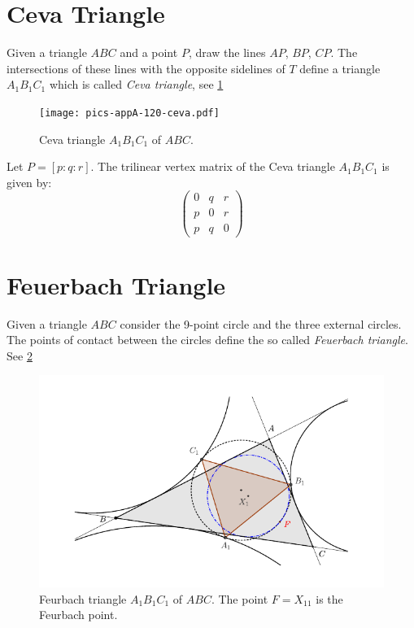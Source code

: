    \section{Ceva Triangle}
   
   Given a triangle $ABC$ and a point $P$, draw the lines $AP$, $BP$, $CP$. The intersections of these lines with the opposite sidelines of $T$ define a triangle $A_1B_1C_1$ which is called {\em Ceva triangle}, see \cref{fig:appA-ceva-triangle}
   
     \begin{figure}[H]
     \centering
      \texttt{[image: pics-appA-120-ceva.pdf]}
    \caption{Ceva triangle $A_1B_1C_1$ of $ABC$.}
    \label{fig:appA-ceva-triangle}
\end{figure}
Let $P=[p:q:r]$. The trilinear vertex matrix of the Ceva triangle $A_1B_1C_1$ is given by:
\[
\left( \begin{matrix}  0 & q & r \\  p & 0 & r
\\p & q & 0 \end{matrix} \right) \]


\section{Feuerbach Triangle}

Given a triangle $ABC$ consider the 9-point circle and the three external circles. The points of contact between the circles define the so called {\em Feuerbach triangle}. See \cref{fig:appA-feurbach-triangle}

   \begin{figure}[H]
     \centering
      \includegraphics[scale=0.9]{zappA/pics/pics-appA-130-feurbach-triangle.pdf}
    \caption{Feurbach triangle $A_1B_1C_1$ of $ABC$. The point $F=X_{11}$ is the Feurbach point.}
    \label{fig:appA-feurbach-triangle}
\end{figure}



